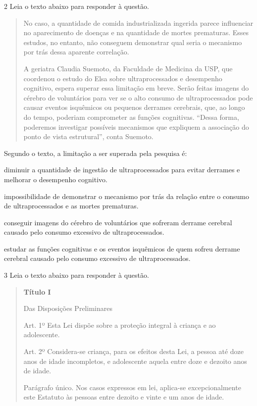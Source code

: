 \num{2} Leia o texto abaixo para responder à questão. 

\begin{quote}

No caso, a quantidade de comida industrializada ingerida parece
influenciar no aparecimento de doenças e na quantidade de mortes
prematuras. Esses estudos, no entanto, não conseguem demonstrar qual
seria o mecanismo por trás dessa aparente correlação.

A geriatra Claudia Suemoto, da Faculdade de Medicina da USP, que
coordenou o estudo do Elsa sobre ultraprocessados e desempenho
cognitivo, espera superar essa limitação em breve. Serão feitas imagens
do cérebro de voluntários para ver se o alto consumo de ultraprocessados
pode causar eventos isquêmicos ou pequenos derrames cerebrais, que, ao
longo do tempo, poderiam comprometer as funções cognitivas. ``Dessa
forma, poderemos investigar possíveis mecanismos que expliquem a
associação do ponto de vista estrutural'', conta Suemoto.

\end{quote}

\pagebreak

Segundo o texto, a limitação a ser superada pela pesquisa é:

\begin{escolha}

    \item diminuir a quantidade de ingestão de ultraprocessados para evitar derrames e melhorar o desempenho cognitivo.

    \item impossibilidade de demonstrar o mecanismo por trás da relação entre o consumo de ultraprocessados e as mortes prematuras.
  
    \item conseguir imagens do cérebro de voluntários que sofreram derrame cerebral causado pelo consumo excessivo de ultraprocessados.
  
    \item estudar as funções cognitivas e os eventos isquêmicos de quem sofreu derrame cerebral causado pelo consumo excessivo de ultraprocessados.

\end{escolha}

\num{3} Leia o texto abaixo para responder à questão. 

\begin{quote}

\textbf{Título I}

Das Disposições Preliminares

Art. 1º Esta Lei dispõe sobre a proteção integral à criança e ao
adolescente.

Art. 2º Considera-se criança, para os efeitos desta Lei, a pessoa até
doze anos de idade incompletos, e adolescente aquela entre doze e
dezoito anos de idade.

Parágrafo único. Nos casos expressos em lei, aplica-se excepcionalmente
este Estatuto às pessoas entre dezoito e vinte e um anos de idade.

\end{quote}

